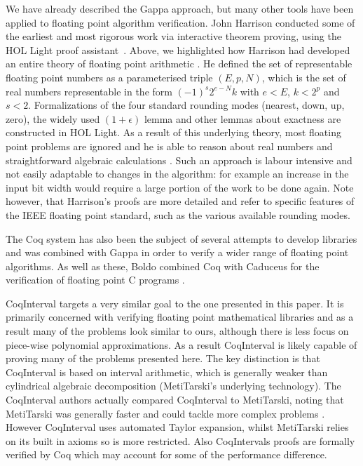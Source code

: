 \documentclass{fac}
\begin{document}
We have already described the Gappa approach, but many other tools have been applied to floating point algorithm verification. John Harrison conducted some of the earliest and most rigorous work via interactive theorem proving, using the HOL Light proof assistant~\cite{harrison1997floating}. Above, we highlighted how Harrison had developed an entire theory of floating point arithmetic \cite{harrison1999machine}. He defined the set of representable floating point numbers as a parameterised triple $(E,p,N)$, which is the set of real numbers representable in the form $(-1)^s 2^{e-N} k$ with $e<E$, $k<2^p$ and $s<2$. Formalizations of the four standard rounding modes (nearest, down, up, zero), the widely used $(1+\epsilon)$ lemma and other lemmas about exactness are constructed in HOL Light. As a result of this underlying theory, most floating point problems are ignored and he is able to reason about real numbers and straightforward algebraic calculations \cite{harrison1999machine}. Such an approach is labour intensive and not easily adaptable to changes in the algorithm: for example an increase in the input bit width would require a large portion of the work to be done again. Note however, that Harrison's proofs are more detailed and refer to specific features of the IEEE floating point standard, such as the various available rounding modes. 

 The Coq system has also been the subject of several attempts to develop libraries \cite{daumas2001generic,melquiond2012floating,boldo2011flocq} and was combined with Gappa \cite{boldo2009combining,daumas2010certification} in order to verify a wider range of floating point algorithms. As well as these, Boldo combined Coq with Caduceus for the verification of floating point C programs \cite{boldo2007formal}.
 
 CoqInterval \cite{martin2016proving} targets a very similar goal to the one presented in this paper. It is primarily concerned with verifying floating point mathematical libraries and as a result many of the problems look similar to ours, although there is less focus on piece-wise polynomial approximations. As a result CoqInterval is likely capable of proving many of the problems presented here. The key distinction is that CoqInterval is based on interval arithmetic, which is generally weaker than cylindrical algebraic decomposition (MetiTarski's underlying technology). The CoqInterval authors actually compared CoqInterval to MetiTarski, noting that MetiTarski was generally faster and could tackle more complex problems \cite{martin2016proving}. However CoqInterval uses automated Taylor expansion, whilst MetiTarski relies on its built in axioms so is more restricted. Also CoqIntervals proofs are formally verified by Coq which may account for some of the performance difference. 
 
\end{document}

